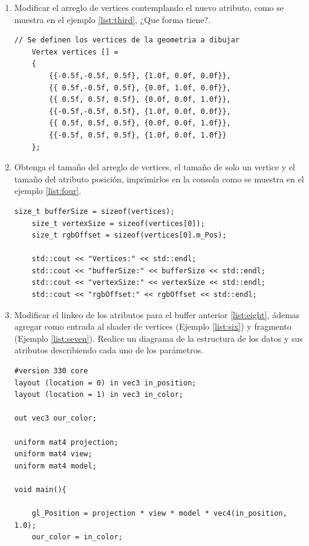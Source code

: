 \documentclass[11pt, english]{article}
\begin{document}
\begin{enumerate}
\item Modificar el arreglo de vertices contemplando el nuevo atributo, como se muestra en el ejemplo \ref{list:third}, ¿Que forma tiene?.

\begin{lstlisting}[label={list:third},caption=Arreglo de vertices., style=customc]
	// Se definen los vertices de la geometria a dibujar
	Vertex vertices [] =
	{
		{{-0.5f,-0.5f, 0.5f}, {1.0f, 0.0f, 0.0f}},
		{{ 0.5f,-0.5f, 0.5f}, {0.0f, 1.0f, 0.0f}},
		{{ 0.5f, 0.5f, 0.5f}, {0.0f, 0.0f, 1.0f}},
		{{-0.5f,-0.5f, 0.5f}, {1.0f, 0.0f, 0.0f}},
		{{ 0.5f, 0.5f, 0.5f}, {0.0f, 0.0f, 1.0f}},
		{{-0.5f, 0.5f, 0.5f}, {1.0f, 0.0f, 1.0f}}
	};
\end{lstlisting}

\item Obtenga el tamaño del arreglo de vertices, el tamaño de solo un vertice y el tamaño del atributo posición, imprimirlos en la consola como se muestra en el ejemplo \ref{list:four}.

\begin{lstlisting}[label={list:four},caption={Tamaño del buffer, vertice y atributo posición.}, style=customc]
	size_t bufferSize = sizeof(vertices);
	size_t vertexSize = sizeof(vertices[0]);
	size_t rgbOffset = sizeof(vertices[0].m_Pos);

	std::cout << "Vertices:" << std::endl;
	std::cout << "bufferSize:" << bufferSize << std::endl;
	std::cout << "vertexSize:" << vertexSize << std::endl;
	std::cout << "rgbOffset:" << rgbOffset << std::endl;
\end{lstlisting}

\item Modificar el linkeo de los atributos para el buffer anterior \ref{list:eight}, ádemas agregar como entrada al shader de vertices (Ejemplo \ref{list:six}) y fragmento (Ejemplo \ref{list:seven}).  Realice un diagrama de la estructura de los datos y sus atributos describiendo cada uno de los parámetros.

\begin{lstlisting}[label={list:six},caption={Vertex Shader.}, style=customc]
#version 330 core
layout (location = 0) in vec3 in_position;
layout (location = 1) in vec3 in_color;

out vec3 our_color;

uniform mat4 projection;
uniform mat4 view;
uniform mat4 model;

void main(){

	gl_Position = projection * view * model * vec4(in_position, 1.0);
	our_color = in_color;


\end{lstlisting}
\end{enumerate}
\end{document}
